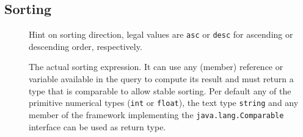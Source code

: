 \documentclass[11pt,a4paper]{article}
\begin{document}
\subsection{Sorting}
\label{sec:json-ld-sorting}
\begin{attributes}{}
\end{attributes}
\begin{description}
	\item[] Hint on sorting direction, legal values are \texttt{asc} or \texttt{desc} for ascending or descending order, respectively.
\end{description}
\begin{elements}{}
\end{elements}
\begin{description}
	\item[] The actual sorting expression. It can use any (member) reference or variable available in the query to compute its result and must return a type that is comparable to allow stable sorting. Per default any of the primitive numerical types (\texttt{int} or \texttt{float}), the text type \texttt{string} and any member of the \icarus framework implementing the \texttt{java.lang.Comparable} interface can be used as return type.
\end{description}

\end{document}
